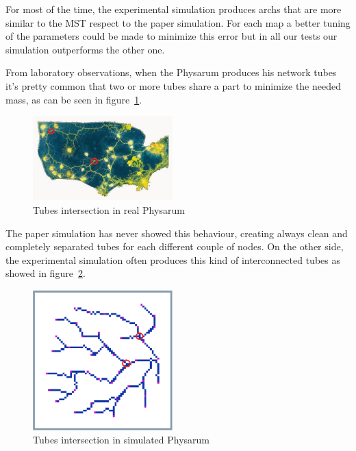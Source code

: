 \par
For most of the time, the experimental simulation produces archs that are more similar to the MST respect to the paper simulation. For each map a better tuning of the parameters could be made to minimize this error but in all our tests our simulation outperforms the other one.

\par
From laboratory observations, when the Physarum produces his network tubes it's pretty common that two or more tubes share a part to minimize the needed mass, as can be seen in figure~\ref{fig:tube_intersection_red}.

\begin{figure}[H]
  \centering
    \includegraphics[width=0.48\textwidth]{tube_intersection_red}%
    
  \caption{Tubes intersection in real Physarum}
  \label{fig:tube_intersection_red}
\end{figure}

\par
The paper simulation has never showed this behaviour, creating always clean and completely separated tubes for each different couple of nodes. On the other side, the experimental simulation often produces this kind of interconnected tubes as showed in figure~\ref{fig:wsn_40_red_intersection}.

\begin{figure}[H]
  \centering
    \includegraphics[width=0.48\textwidth]{wsn_40_red_intersection}%
    
  \caption{Tubes intersection in simulated Physarum}
  \label{fig:wsn_40_red_intersection}
\end{figure}


